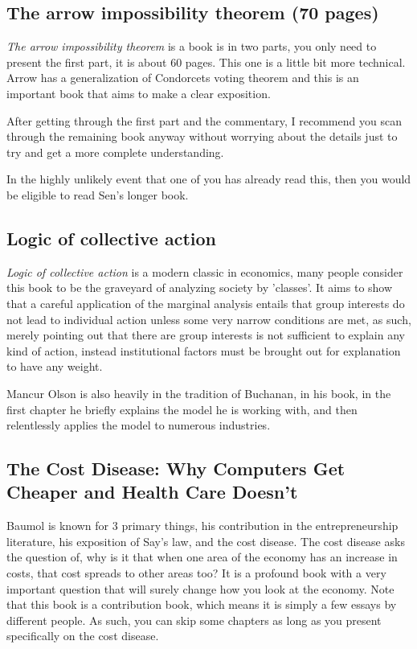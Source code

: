 \documentclass[12pt]{report}
\numberwithin{equation}{section}
\begin{document}
\subsection*{The arrow impossibility theorem (70 pages)}

\textit{The arrow impossibility theorem} is a book is in two parts, you only need to present the first part, it is about 60 pages. This one is a little bit more technical. Arrow has a generalization of Condorcets voting theorem and this is an important book that aims to make a clear exposition.

After getting through the first part and the commentary, I recommend you scan through the remaining book anyway without worrying about the details just to try and get a more complete understanding. 

In the highly unlikely event that one of you has already read this, then you would be eligible to read Sen's longer book. 

\subsection*{Logic of collective action}

\textit{Logic of collective action} is a modern classic in economics, many people consider this book to be the graveyard of analyzing society by 'classes'. It aims to show that a careful application of the marginal analysis entails that group interests do not lead to individual action unless some very narrow conditions are met, as such, merely pointing out that there are group interests is not sufficient to explain any kind of action, instead institutional factors must be brought out for explanation to have any weight. 

Mancur Olson is also heavily in the tradition of Buchanan, in his book, in the first chapter he briefly explains the model he is working with, and then relentlessly applies the model to numerous industries. 


\subsection*{The Cost Disease: Why Computers Get Cheaper and Health Care Doesn't }

Baumol is known for 3 primary things, his contribution in the entrepreneurship literature, his exposition of Say's law, and the cost disease. The cost disease asks the question of, why is it that when one area of the economy has an increase in costs, that cost spreads to other areas too? It is a profound book with a very important question that will surely change how you look at the economy. Note that this book is a contribution book, which means it is simply a few essays by different people. As such, you can skip some chapters as long as you present specifically on the cost disease. 
\end{document}
